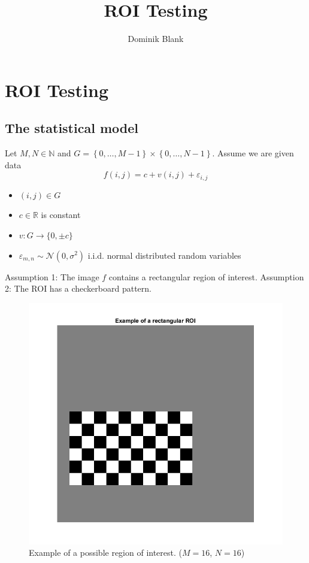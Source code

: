\documentclass{beamer}
\author{Dominik Blank}
\title{ROI Testing}
\institute{Georg-August-Universität Göttingen}
\begin{document}
\begin{frame}
	\maketitle
\end{frame}

\begin{frame}
	\tableofcontents
\end{frame}

\section{ROI Testing}

\subsection{The statistical model}

\begin{frame}
	Let $M, N \in \mathbb{N}$ and $G = \left\{ 0, \dots, M-1 \right\} \times  \left\{ 0, \dots, N-1 \right\}$. Assume we are given data
	\begin{equation*}\label{f}
		f(i, j) = c + v(i, j) + \varepsilon_{i, j}
	\end{equation*}
	\begin{itemize}
		\item $(i, j) \in G$
		\item $c \in \mathbb{R}$ is constant
		\item $v: G \to \{ 0, \pm c \}$
		\item $\varepsilon_{m, n} \sim \mathcal{N}(0, \sigma^2)$ i.i.d. normal distributed random variables
	\end{itemize}
	
	Assumption 1: The image $f$ contains a rectangular region of interest.
	Assumption 2: The ROI has a checkerboard pattern.
\end{frame}

\begin{frame}
	\begin{figure}
		\includegraphics[width=0.6\linewidth]{Testing/ROI}
		\caption[ROI]{Example of a possible region of interest. ($M = 16$, $N = 16$)}
		\label{fig:ROI}
	\end{figure}
\end{frame}
\end{document}
